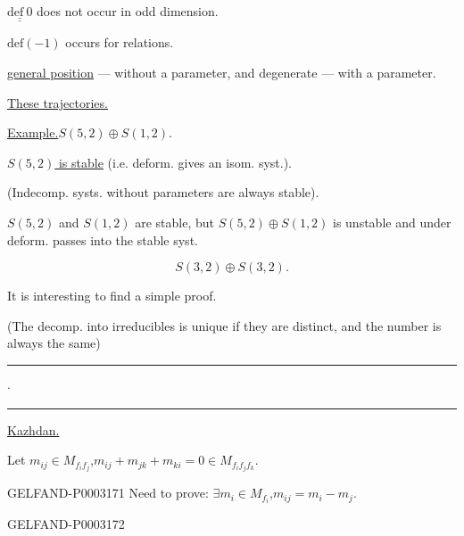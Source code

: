 $\underline{\underline{\mathrm{def}\ 0}}$ does not occur in odd dimension.

$\mathrm{def}(-1)$ occurs for relations.

\uline{general position} --- without a parameter, and degenerate --- with a parameter.



\hfill{}

\uline{These trajectories.}

\uline{Example.}\qquad $S (5,2)\oplus S (1,2)$.

\uline{$S (5,2)$ is stable} (i.e. deform. gives an isom. syst.).

(Indecomp. systs. without parameters are always stable).

$S (5,2)$ and $S (1,2)$ are stable, but $S (5,2)\oplus S (1,2)$ is unstable and under deform. passes into the stable syst.

\begin{equation*}S (3,2)\oplus S (3,2).\end{equation*}

It is interesting to find a simple proof.

(The decomp. into irreducibles is unique if they are distinct, and the number is always the same)

\begin{center}\rule{20mm}{.6pt}\quad $\cdot$\quad\rule{20mm}{.6pt}\end{center}

\uline{Kazhdan.}

Let $m_{ij}\in M_{f_i f_j}$,\quad $m_{ij}+m_{jk}+m_{ki}=0\in M_{f_i f_j f_k}$.

\begin{GelfandAdjacentEvidence}{GELFAND-P000317}{1}
Need to prove: $\exists m_i\in M_{f_i}$,\quad $m_{ij}=m_i-m_j$.

\end{GelfandAdjacentEvidence}
\begin{GelfandAdjacentEvidence}{GELFAND-P000317}{2}


\end{GelfandAdjacentEvidence}


